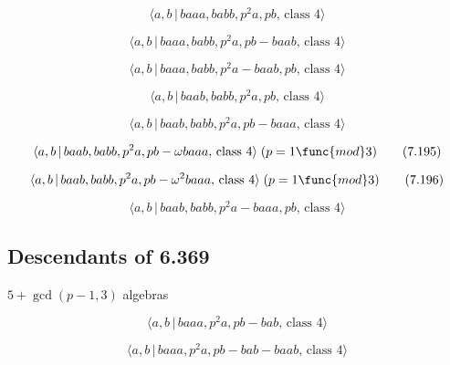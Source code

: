\documentclass[10pt]{article}
\begin{document}
\begin{equation}
\langle a,b\,|\,baaa,babb,p^2a,pb,\,\text{class }4\rangle  \tag{7.190}
\end{equation}

\begin{equation}
\langle a,b\,|\,baaa,babb,p^2a,pb-baab,\,\text{class }4\rangle  \tag{7.191}
\end{equation}

\begin{equation}
\langle a,b\,|\,baaa,babb,p^2a-baab,pb,\,\text{class }4\rangle  \tag{7.192}
\end{equation}

\begin{equation}
\langle a,b\,|\,baab,babb,p^2a,pb,\,\text{class }4\rangle  \tag{7.193}
\end{equation}

\begin{equation}
\langle a,b\,|\,baab,babb,p^2a,pb-baaa,\,\text{class }4\rangle  \tag{7.194}
\end{equation}

\begin{equation}
\langle a,b\,|\,baab,babb,p^{2}a,pb-\omega baaa,\,\text{class }4\rangle
\;(p=1\func{mod}3)  \tag{7.195}
\end{equation}

\begin{equation}
\langle a,b\,|\,baab,babb,p^{2}a,pb-\omega ^{2}baaa,\,\text{class }4\rangle
\;(p=1\func{mod}3)  \tag{7.196}
\end{equation}

\begin{equation}
\langle a,b\,|\,baab,babb,p^2a-baaa,pb,\,\text{class }4\rangle  \tag{7.197}
\end{equation}

\subsection{Descendants of 6.369}

$5+\gcd (p-1,3)$ algebras

\begin{equation}
\langle a,b\,|\,baaa,p^2a,pb-bab,\,\text{class }4\rangle  \tag{7.198}
\end{equation}

\begin{equation}
\langle a,b\,|\,baaa,p^2a,pb-bab-baab,\,\text{class }4\rangle  \tag{7.199}
\end{equation}
\end{document}
